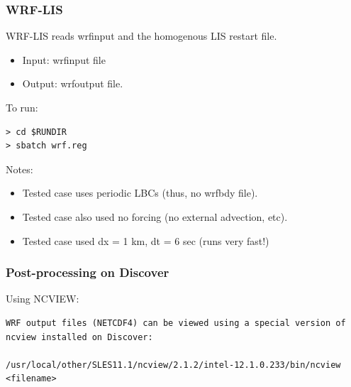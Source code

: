 \begin{frame}[fragile]\frametitle{WRF-LIS}

\footnotesize{
WRF-LIS reads wrfinput and the homogenous LIS restart file.
\begin{itemize}
\item Input: wrfinput file
\item Output: wrfoutput file.
\end{itemize}
}    
\hrulefill\par
\footnotesize{To run:}
\begin{lstlisting}
> cd $RUNDIR
> sbatch wrf.reg
\end{lstlisting}
\footnotesize{
\hrulefill\par       
Notes:
\begin{itemize}
\item Tested case uses periodic LBCs (thus, no wrfbdy file).
\item Tested case also used no forcing (no external advection, etc).
\item Tested case used dx = 1 km, dt = 6 sec (runs very fast!)
\end{itemize}
}    

\end{frame}

\begin{frame}[fragile]
\frametitle{Post-processing on Discover}

Using NCVIEW:

\begin{lstlisting}
WRF output files (NETCDF4) can be viewed using a special version of ncview installed on Discover:

/usr/local/other/SLES11.1/ncview/2.1.2/intel-12.1.0.233/bin/ncview <filename>
\end{lstlisting}

\end{frame}

